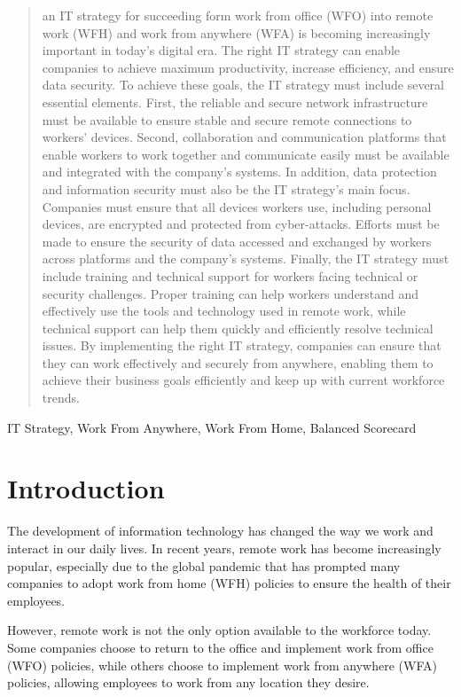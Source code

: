 \documentclass[conference]{IEEEtran}
\begin{document}
\begin{abstract}
an IT strategy for succeeding form work from office (WFO) into remote work (WFH) and work from anywhere (WFA) is becoming increasingly important in today's digital era. The right IT strategy can enable companies to achieve maximum productivity, increase efficiency, and ensure data security. To achieve these goals, the IT strategy must include several essential elements. First, the reliable and secure network infrastructure must be available to ensure stable and secure remote connections to workers' devices. Second, collaboration and communication platforms that enable workers to work together and communicate easily must be available and integrated with the company's systems. In addition, data protection and information security must also be the IT strategy's main focus. Companies must ensure that all devices workers use, including personal devices, are encrypted and protected from cyber-attacks. Efforts must be made to ensure the security of data accessed and exchanged by workers across platforms and the company's systems. Finally, the IT strategy must include training and technical support for workers facing technical or security challenges. Proper training can help workers understand and effectively use the tools and technology used in remote work, while technical support can help them quickly and efficiently resolve technical issues. By implementing the right IT strategy, companies can ensure that they can work effectively and securely from anywhere, enabling them to achieve their business goals efficiently and keep up with current workforce trends.

\end{abstract}

\begin{IEEEkeywords}
IT Strategy, Work From Anywhere, Work From Home, Balanced Scorecard
\end{IEEEkeywords}

\section{Introduction}
The development of information technology has changed the way we work and interact in our daily lives. In recent years, remote work has become increasingly popular, especially due to the global pandemic that has prompted many companies to adopt work from home (WFH) policies to ensure the health of their employees.

However, remote work is not the only option available to the workforce today. Some companies choose to return to the office and implement work from office (WFO) policies, while others choose to implement work from anywhere (WFA) policies, allowing employees to work from any location they desire.
\end{document}

